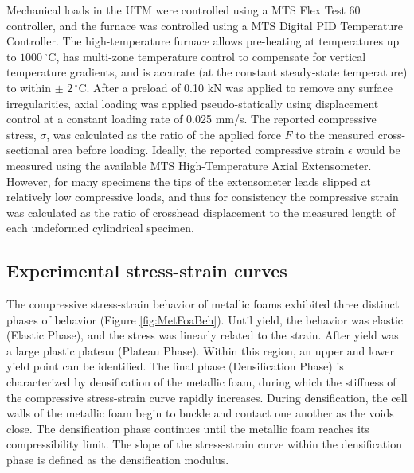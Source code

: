 \documentclass[review]{elsarticle}
\begin{document}
Mechanical loads in the UTM were controlled using a MTS Flex Test 60 controller, and the furnace was controlled using a MTS Digital PID Temperature Controller. The high-temperature furnace allows pre-heating at temperatures up to $1000\,^{\circ}\mathrm{C}$, has multi-zone temperature control to compensate for vertical temperature gradients, and is accurate (at the constant steady-state temperature) to within $\pm$ $2\,^{\circ}\mathrm{C}$. After a preload of 0.10 kN was applied to remove any surface irregularities, axial loading was applied pseudo-statically using displacement control at a constant loading rate of 0.025 mm/s. The reported compressive stress, $\sigma$, was calculated as the ratio of the applied force $F$ to the measured cross-sectional area before loading. Ideally, the reported compressive strain $\epsilon$ would be measured using the available MTS High-Temperature Axial Extensometer. However, for many specimens the tips of the extensometer leads slipped at relatively low compressive loads, and thus for consistency the compressive strain was calculated as the ratio of crosshead displacement to the measured length of each undeformed cylindrical specimen.


\subsection{Experimental stress-strain curves}

The compressive stress-strain behavior of metallic foams exhibited three distinct phases of behavior (Figure \ref{fig:MetFoaBeh}). Until yield, the behavior was elastic (Elastic Phase), and the stress was linearly related to the strain. After yield was a large plastic plateau (Plateau Phase). Within this region, an upper and lower yield point can be identified. The final phase (Densification Phase) is characterized by densification of the metallic foam, during which the stiffness of the compressive stress-strain curve rapidly increases. During densification, the cell walls of the metallic foam begin to buckle and contact one another as the voids close. The densification phase continues until the metallic foam reaches its compressibility limit. The slope of the stress-strain curve within the densification phase is defined as the densification modulus.
\end{document}
